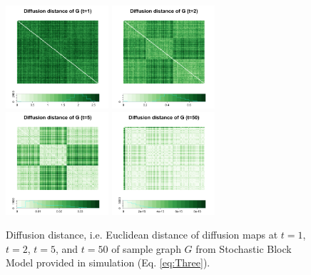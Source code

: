 \documentclass[12pt]{article}
\theoremstyle{definition}
\begin{document}
\begin{figure}[H]
	\centering
	\includegraphics[width=1.5in]{../Figure/Dx1.png}
	\includegraphics[width=1.5in]{../Figure/Dx2.png}
	\includegraphics[width=1.5in]{../Figure/Dx5.png}
	\includegraphics[width=1.5in]{../Figure/Dx50.png}
	\caption{Diffusion distance, i.e. Euclidean distance of diffusion maps at $t=1$, $t=2$, $t=5$, and $t=50$ of sample graph $G$ from Stochastic Block Model provided in simulation (Eq. \ref{eq:Three}).}
	\label{fig:diffusions}
\end{figure}	
	
\end{document}
